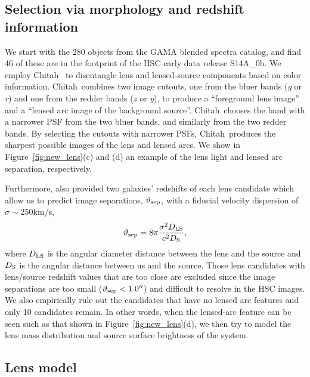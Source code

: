 \documentclass[apj]{emulateapj}
\newcommand{\be}{\begin{equation}}
\newcommand{\ee}{\end{equation}}
\def\chitah{{\sc Chitah}}
\newcommand{\fref}[1]{Figure~\ref{#1}}
\begin{document}
\subsection{Selection via morphology and redshift information}
\label{subsec:selection}

We start with the 280 objects from the GAMA blended spectra catalog, and find 46 of these are in the footprint of the HSC early data release S14A\_0b.
We employ \chitah\ \citep{ChanEtal15} to disentangle lens and lensed-source components based on color information.
\chitah\ combines two image cutouts, one from the bluer bands ({\it g} or {\it r}) and one from the redder bands ({\it z} or {\it y}), to produce a ``foreground lens image'' and a ``lensed arc image of the background source''. 
\chitah\ chooses the band with a narrower PSF from the two bluer bands, and similarly from the two redder bands.
By selecting the cutouts with narrower PSFs, \chitah\ produces the sharpest possible images of the lens and lensed arcs.
We show in \fref{fig:new_lens}(c) and (d) an example of the lens light and lensed arc separation, respectively.

Furthermore, \citet{HolwerdaEtal15} also provided two galaxies' redshifts of each lens candidate 
which allow us to predict image separations, $\vartheta_{\rm sep}$, with a fiducial velocity dispersion of $\sigma\sim250$km/s, 
\be
  \vartheta_{\rm sep} = 8 \pi {\sigma^2 D_{\rm LS} \over c^2 D_{\rm S}},
\ee
where $D_{\rm LS}$ is the angular diameter distance between the lens and the source and $D_{\rm S}$ is the angular distance between us and the source. 
Those lens candidates with lens/source redshift values that are too close are excluded 
since the image separations are too small ($\vartheta_{\rm sep} < 1.0\mbox{$^{\prime\prime}$}$) and difficult to resolve in the HSC images. 
We also empirically rule out the candidates that have no lensed arc features 
and only 10 candidates remain.
In other words, when the lensed-arc feature can be seen such as that shown in \fref{fig:new_lens}(d), 
we then try to model the lens mass distribution and source surface brightness of the system.

\subsection{Lens model}
\label{subsec:model}
\end{document}
